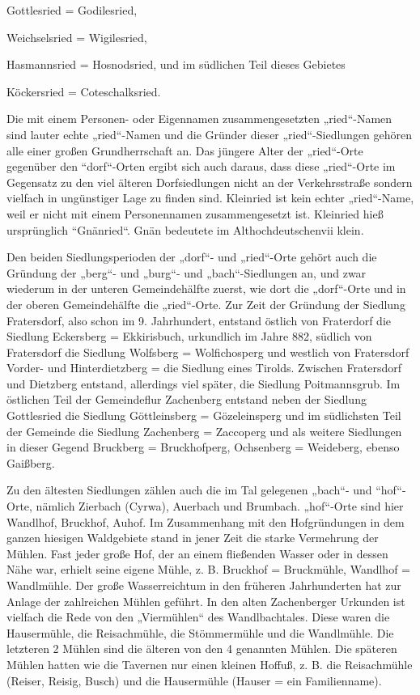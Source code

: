 \documentclass{book}
\begin{document}
Gottlesried = Godilesried,

Weichselsried = Wigilesried,

Hasmannsried = Hosnodsried, und im südlichen Teil dieses Gebietes

Köckersried = Coteschalksried.

Die mit einem Personen- oder Eigennamen zusammengesetzten „ried“-Namen sind
lauter echte „ried“-Namen und die Gründer dieser „ried“-Siedlungen gehören alle
einer großen Grundherrschaft an. Das jüngere Alter der „ried“-Orte gegenüber den
“dorf“-Orten ergibt sich auch daraus, dass diese „ried“-Orte im Gegensatz zu den
viel älteren Dorfsiedlungen nicht an der Verkehrsstraße sondern vielfach in
ungünstiger Lage zu finden sind. Kleinried ist kein echter „ried“-Name, weil er
nicht mit einem Personennamen zusammengesetzt ist. Kleinried hieß ursprünglich
“Gnänried“. Gnän bedeutete im Althochdeutschenvii klein.

Den beiden Siedlungsperioden der „dorf“- und „ried“-Orte gehört auch die
Gründung der „berg“- und „burg“- und „bach“-Siedlungen an, und zwar wiederum in
der unteren Gemeindehälfte zuerst, wie dort die „dorf“-Orte und in der oberen
Gemeindehälfte die „ried“-Orte. Zur Zeit der Gründung der Siedlung Fratersdorf,
also schon im 9. Jahrhundert, entstand östlich von Fraterdorf die Siedlung
Eckersberg = Ekkirisbuch, urkundlich im Jahre 882, südlich von Fratersdorf die
Siedlung Wolfsberg = Wolfichosperg und westlich von Fratersdorf Vorder- und
Hinterdietzberg = die Siedlung eines Tirolds. Zwischen Fratersdorf und Dietzberg
entstand, allerdings viel später, die Siedlung Poitmannsgrub. Im östlichen Teil
der Gemeindeflur Zachenberg entstand neben der Siedlung Gottlesried die Siedlung
Göttleinsberg = Gözeleinsperg und im südlichsten Teil der Gemeinde die Siedlung
Zachenberg = Zaccoperg und als weitere Siedlungen in dieser Gegend Bruckberg =
Bruckhofperg, Ochsenberg = Weideberg, ebenso Gaißberg.

Zu den ältesten Siedlungen zählen auch die im Tal gelegenen „bach“- und
“hof“-Orte, nämlich Zierbach (Cyrwa), Auerbach und Brumbach. „hof“-Orte sind
hier Wandlhof, Bruckhof, Auhof. Im Zusammenhang mit den Hofgründungen in dem
ganzen hiesigen Waldgebiete stand in jener Zeit die starke Vermehrung der
Mühlen. Fast jeder große Hof, der an einem fließenden Wasser oder in dessen Nähe
war, erhielt seine eigene Mühle, z. B. Bruckhof = Bruckmühle, Wandlhof =
Wandlmühle. Der große Wasserreichtum in den früheren Jahrhunderten hat zur
Anlage der zahlreichen Mühlen geführt. In den alten Zachenberger Urkunden ist
vielfach die Rede von den „Viermühlen“ des Wandlbachtales. Diese waren die
Hausermühle, die Reisachmühle, die Stömmermühle und die Wandlmühle. Die
letzteren 2 Mühlen sind die älteren von den 4 genannten Mühlen. Die späteren
Mühlen hatten wie die Tavernen nur einen kleinen Hoffuß, z. B. die Reisachmühle
(Reiser, Reisig, Busch) und die Hausermühle (Hauser = ein Familienname).
\end{document}
